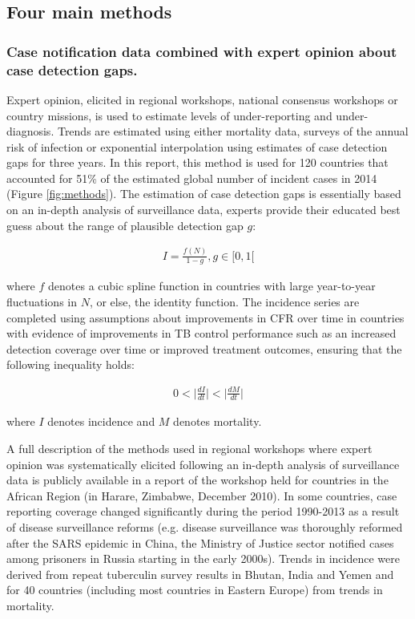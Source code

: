 \subsection {Four main methods}

\subsubsection {Case notification data combined with expert opinion about case detection gaps.} Expert opinion, elicited in regional workshops, national consensus workshops or country missions, is used to estimate levels of under-reporting and under-diagnosis. Trends are estimated using either mortality data, surveys of the annual risk of infection or exponential interpolation using estimates of case detection gaps for three years. In this report, this method is used for 120 countries that accounted for 51\% of the estimated global number of incident cases in 2014 (Figure \ref{fig:methods}). The estimation of case detection gaps is essentially based on an in-depth analysis of surveillance data, experts provide their educated best guess about the range of plausible detection gap $g$:

\begin{align*}
I=\frac{f(N)}{1-g}, g\in[0,1[
\end{align*}

where $f$ denotes a cubic spline function in countries with large year-to-year fluctuations in $N$, or else, the identity function. The incidence series are completed using assumptions about improvements in CFR over time in countries with evidence of improvements in TB control performance such as an increased detection coverage over time or improved treatment outcomes, ensuring that the following inequality holds: 

\begin{align*}
0 < \lvert \frac{dI}{dt} \rvert < \lvert \frac{dM}{dt} \rvert 
\end{align*}

where $I$ denotes incidence and $M$ denotes mortality.

A full description of the methods used in regional workshops where expert opinion was systematically elicited following an in-depth analysis of surveillance data is publicly available in a report of the workshop held for countries in the African Region (in Harare, Zimbabwe, December 2010\cite{WHO}). In some countries, case reporting coverage changed significantly during the period 1990-2013 as a result of disease surveillance reforms (e.g. disease surveillance was thoroughly reformed after the SARS epidemic in China, the Ministry of Justice sector notified cases among prisoners in Russia starting in the early 2000s). Trends in incidence were derived from repeat tuberculin survey results in Bhutan, India and Yemen and for 40 countries (including most countries in Eastern Europe) from trends in mortality. 

